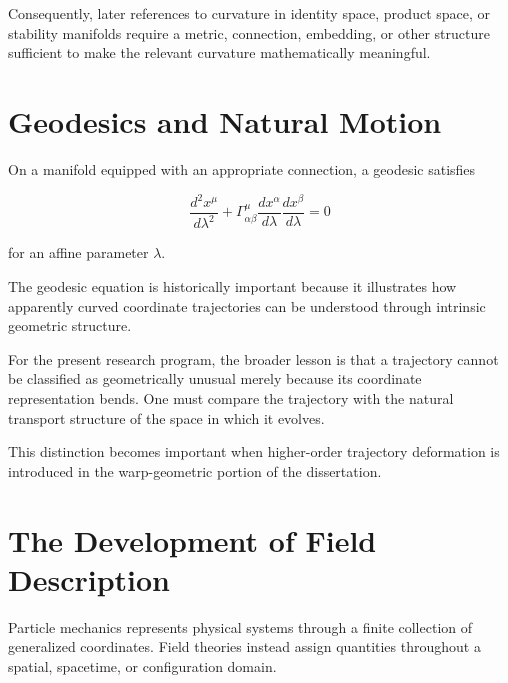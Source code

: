 \documentclass[12pt,oneside]{book}
\begin{document}
Consequently, later references to curvature in identity space,
product space, or stability manifolds require a metric,
connection, embedding, or other structure sufficient to make
the relevant curvature mathematically meaningful.


\section{Geodesics and Natural Motion}
\label{sec:geodesic-history}

On a manifold equipped with an appropriate connection, a
geodesic satisfies

\begin{equation}
    \frac{d^2x^\mu}{d\lambda^2}
    +
    \Gamma^\mu_{\alpha\beta}
    \frac{dx^\alpha}{d\lambda}
    \frac{dx^\beta}{d\lambda}
    =
    0
    \label{eq:geodesic-equation}
\end{equation}

for an affine parameter \(\lambda\).

The geodesic equation is historically important because it
illustrates how apparently curved coordinate trajectories can
be understood through intrinsic geometric structure.

For the present research program, the broader lesson is that a
trajectory cannot be classified as geometrically unusual merely
because its coordinate representation bends. One must compare
the trajectory with the natural transport structure of the
space in which it evolves.

This distinction becomes important when higher-order
trajectory deformation is introduced in the warp-geometric
portion of the dissertation.


\section{The Development of Field Description}
\label{sec:field-description-history}

Particle mechanics represents physical systems through a finite
collection of generalized coordinates. Field theories instead
assign quantities throughout a spatial, spacetime, or
configuration domain.
\end{document}
